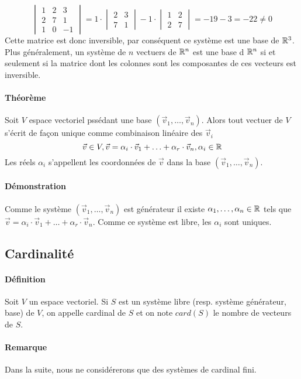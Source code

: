 $$\begin{vmatrix}
  1 & 2 & 3 \\
  2 & 7 & 1 \\
  1 & 0 & -1
\end{vmatrix}
=
1 \cdot 
\begin{vmatrix}
  2 & 3 \\
  7 & 1
\end{vmatrix}
-1 \cdot
\begin{vmatrix}
  1 & 2 \\
  2 & 7
\end{vmatrix}
= -19 -3 = -22 \neq 0$$
Cette matrice est donc inversible, par conséquent ce système est une base de $\mathbb{R}^3$. \\
Plus généralement, un système de $n$ vectuers de $\mathbb{R}^n$ est une base d $\mathbb{R}^n$ si et seulement si la matrice dont les colonnes sont les composantes de ces vecteurs est inversible.

\paragraph{Théorème} Soit $V$ espace vectoriel pssédant une base $(\vec{v}_1, \ldots, \vec{v}_n)$. Alors tout vectuer de $V$ s'écrit de façon unique comme combinaison linéaire des $\vec{v}_i$
$$\vec{v} \in V, \vec{v}=\alpha_i \cdot \vec{v}_1 + \ldots + \alpha_r \cdot \vec{v}_n, \alpha_i \in \mathbb{R}$$
Les réels $\alpha_i$ s'appellent les coordonnées de $\vec{v}$ dans la base $(\vec{v}_1, \ldots, \vec{v}_n)$.
\paragraph{Démonstration} Comme le système $(\vec{v}_1, \ldots, \vec{v}_n)$ est générateur il existe  $\alpha_1, \ldots, \alpha_n \in \mathbb{R}$ tels que $\vec{v}=\alpha_i \cdot \vec{v}_1 + \ldots + \alpha_r \cdot \vec{v}_n$. Comme ce système est libre, les $\alpha_i$ sont uniques.

%
\subsection{Cardinalité}
%
\paragraph{Définition} Soit $V$ un espace vectoriel. Si $S$ est un système libre (resp. système générateur, base) de $V$, on appelle cardinal de $S$ et on note $card(S)$ le nombre de vecteurs de $S$.

\paragraph{Remarque} Dans la suite, nous ne considérerons que des systèmes de cardinal fini.


